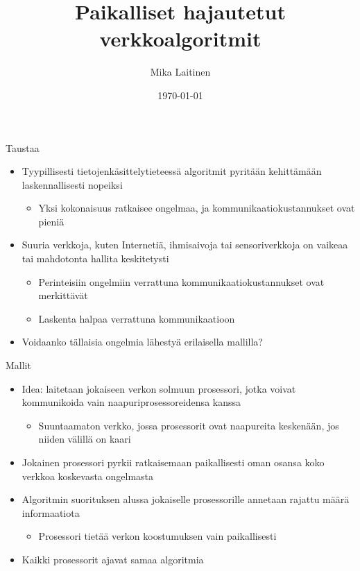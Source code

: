 \documentclass[a4paper, 12pt, finnish]{beamer}
\title{Paikalliset hajautetut verkkoalgoritmit}
\author{Mika Laitinen}
\date{\today}
\begin{document}
\begin{frame}[plain]
    \titlepage
\end{frame}

\begin{frame}{Taustaa}
    \begin{itemize} 
        \item Tyypillisesti tietojenkäsittelytieteessä algoritmit pyritään kehittämään laskennallisesti nopeiksi
        \begin{itemize}
            \item Yksi kokonaisuus ratkaisee ongelmaa, ja kommunikaatiokustannukset ovat pieniä
        \end{itemize} 
        \pause
        \item Suuria verkkoja, kuten Internetiä, ihmisaivoja tai sensoriverkkoja on vaikeaa tai mahdotonta hallita keskitetysti
        \begin{itemize}
            \item Perinteisiin ongelmiin verrattuna kommunikaatiokustannukset ovat merkittävät
            \item Laskenta halpaa verrattuna kommunikaatioon
        \end{itemize}
        \pause
        \item Voidaanko tällaisia ongelmia lähestyä erilaisella mallilla?
    \end{itemize} 
\end{frame}

\begin{frame}{Mallit}
    \begin{itemize}
        \item Idea: laitetaan jokaiseen verkon solmuun prosessori, jotka voivat kommunikoida vain naapuriprosessoreidensa kanssa
        \begin{itemize}
            \item Suuntaamaton verkko, jossa prosessorit ovat naapureita keskenään, jos niiden välillä on kaari
        \end{itemize}
        \pause
        \item Jokainen prosessori pyrkii ratkaisemaan paikallisesti oman osansa koko verkkoa koskevasta ongelmasta
        \pause
        \item Algoritmin suorituksen alussa jokaiselle prosessorille annetaan rajattu määrä informaatiota
        \begin{itemize}
            \item Prosessori tietää verkon koostumuksen vain paikallisesti
        \end{itemize}
        \pause
        \item Kaikki prosessorit ajavat samaa algoritmia
    \end{itemize}
\end{frame}
\end{document}
